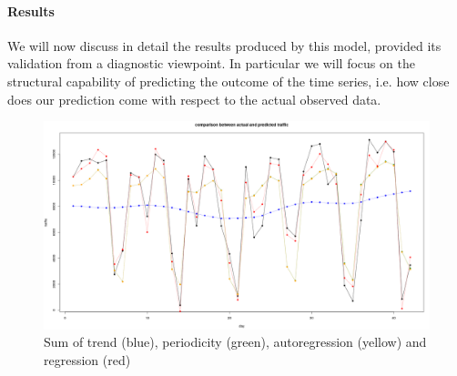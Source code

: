 \documentclass[11pt,twoside]{report}
\begin{document}
\paragraph{Results}
We  will now discuss in detail the results produced by this model, provided its validation from a diagnostic viewpoint. In particular we will focus on the structural capability of predicting the outcome of the time series, i.e. how close does our prediction come with respect to the actual observed data.

\begin{figure}[H]
		\centering
		\includegraphics[width=150 mm]{pictures/m2_g1.png}
		\caption{Sum of trend (blue), periodicity (green), autoregression (yellow) and regression (red)}
		\label{fig:M2_p1}
	\end{figure}
\end{document}
